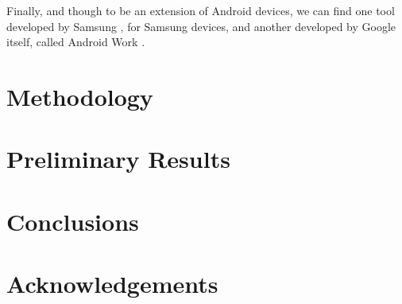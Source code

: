 \documentclass{sig-alternate}
\begin{document}
Finally, and though to be an extension of Android devices, we can find one tool developed by Samsung \cite{Samsung_tool}, for Samsung devices, and another developed by Google itself, called Android Work \cite{AndroidWork_site}.

%
%
\section{Methodology}
\label{sec:methodology}

%
%
\section{Preliminary Results}
\label{sec:results}

%
%
\section{Conclusions}
\label{sec:conclusions}

%
%
\section{Acknowledgements}



\end{document}
